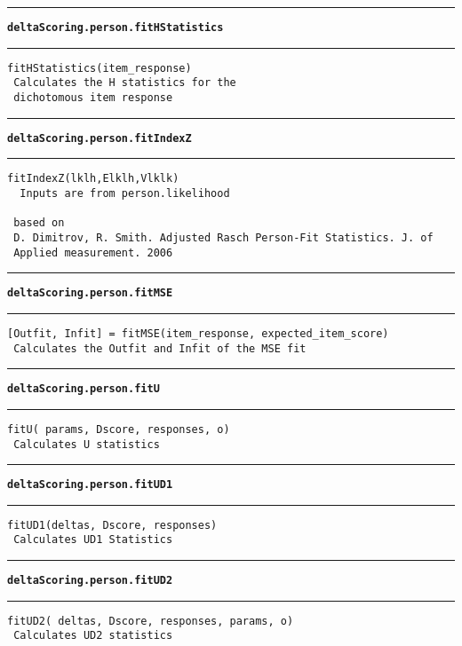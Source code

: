 \par\noindent\rule{\textwidth}{0.4pt}
{\bf\tt deltaScoring.person.fitHStatistics}
\par\noindent\rule{\textwidth}{0.4pt}
\begin{lstlisting}[style=Matlab-bw]
 fitHStatistics(item_response)
 Calculates the H statistics for the
 dichotomous item response
\end{lstlisting}
\par\noindent\rule{\textwidth}{0.4pt}
{\bf\tt deltaScoring.person.fitIndexZ}
\par\noindent\rule{\textwidth}{0.4pt}
\begin{lstlisting}[style=Matlab-bw]
 fitIndexZ(lklh,Elklh,Vlklk)
  Inputs are from person.likelihood

 based on
 D. Dimitrov, R. Smith. Adjusted Rasch Person-Fit Statistics. J. of
 Applied measurement. 2006
\end{lstlisting}
\par\noindent\rule{\textwidth}{0.4pt}
{\bf\tt deltaScoring.person.fitMSE}
\par\noindent\rule{\textwidth}{0.4pt}
\begin{lstlisting}[style=Matlab-bw]
 [Outfit, Infit] = fitMSE(item_response, expected_item_score)
 Calculates the Outfit and Infit of the MSE fit
\end{lstlisting}
\par\noindent\rule{\textwidth}{0.4pt}
{\bf\tt deltaScoring.person.fitU}
\par\noindent\rule{\textwidth}{0.4pt}
\begin{lstlisting}[style=Matlab-bw]
 fitU( params, Dscore, responses, o)
 Calculates U statistics
\end{lstlisting}
\par\noindent\rule{\textwidth}{0.4pt}
{\bf\tt deltaScoring.person.fitUD1}
\par\noindent\rule{\textwidth}{0.4pt}
\begin{lstlisting}[style=Matlab-bw]
 fitUD1(deltas, Dscore, responses)
 Calculates UD1 Statistics
\end{lstlisting}
\par\noindent\rule{\textwidth}{0.4pt}
{\bf\tt deltaScoring.person.fitUD2}
\par\noindent\rule{\textwidth}{0.4pt}
\begin{lstlisting}[style=Matlab-bw]
 fitUD2( deltas, Dscore, responses, params, o)
 Calculates UD2 statistics
\end{lstlisting}
